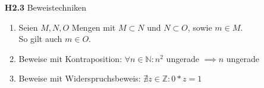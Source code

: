 \documentclass[a4paper,abstract,german]{scrreprt}
\begin{document}
\begin{enumerate}
\begin{enumerate}
	\end{enumerate}
	
		\item[\textbf {H2.3}]
	Beweistechniken
	\begin{enumerate}
	\item
    	Seien $M,N, O$ Mengen mit $M \subset N$ und $N \subset O$, sowie $m \in M$.\\
    	
    	So gilt auch $m \in O$.
    \item
    	Beweise mit Kontraposition: $\forall n \in \mathbb{N}: n^2$ ungerade $\implies n$ ungerade  
    \item
        Beweise mit Widerspruchsbeweis: $\nexists z \in \mathbb{Z}: 0*z=1$\\
    	

	\end{enumerate}

\end{enumerate}
\end{document}

